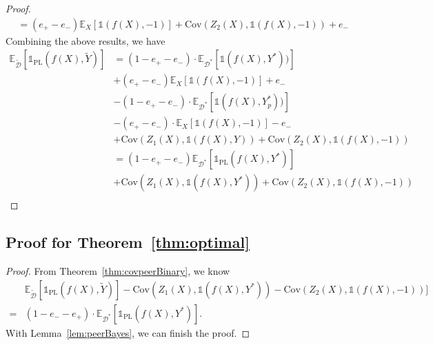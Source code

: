 \documentclass[final]{cvpr}
\newcommand{\BR}{\mathds 1}
\newcommand{\E}{\mathbb E}
\begin{document}
\begin{proof}
\begin{align*}
    &= (e_+ - e_-) \E_X[\BR(f(X),-1)] + \text{Cov}(Z_2(X),\BR(f(X),-1)) + e_-
\end{align*}
Combining the above results, we have
\begin{align*}
\E_{\widetilde{\mathcal D}}[{\BR_{\text{PL}}}(f(X),\tilde{Y})] &= (1-e_+-e_-) \cdot  \E_{\mathcal D^*}[\BR(f(X),Y^*))] \\
&+ (e_+ - e_-) \E_X[\BR(f(X),-1)] + e_-\\
&-(1-e_+-e_-) \cdot \E_{\mathcal D^*}[\BR(f(X),Y^*_p))] \\
&-(e_+ - e_-) \cdot \E_{X}[\BR(f(X),-1)] - e_- \\
&+\text{Cov}(Z_1(X),\BR(f(X),Y))+ \text{Cov}(Z_2(X),\BR(f(X),-1)) \\
&=(1-e_+-e_-)\E_{\mathcal D^*}[{\BR_{\text{PL}}}(f(X),Y^*)]\\
&+\text{Cov}(Z_1(X),\BR(f(X),Y^*))+ \text{Cov}(Z_2(X),\BR(f(X),-1)) \\
\end{align*}
\end{proof}


\subsection{Proof for Theorem~\ref{thm:optimal}}\label{proof:optimal}






\begin{proof}
From Theorem~\ref{thm:covpeerBinary}, we know
\begin{align*}
&\mathbb E_{\widetilde{\mathcal {D}}}[{\BR_{\text{PL}}}(f(X), \widetilde{Y})] - \text{Cov}(Z_1(X),\BR(f(X), Y^*))  - \text{Cov}(Z_2(X),\BR(f(X),-1))\bigg] \\
=& (1-e_{-}-e_{+}) \cdot \mathbb E_{\mathcal D^*}[{\BR_{\text{PL}}}(f(X), Y^*)].
   \end{align*}
With Lemma~\ref{lem:peerBayes}, we can finish the proof.
\end{proof}
\end{document}
